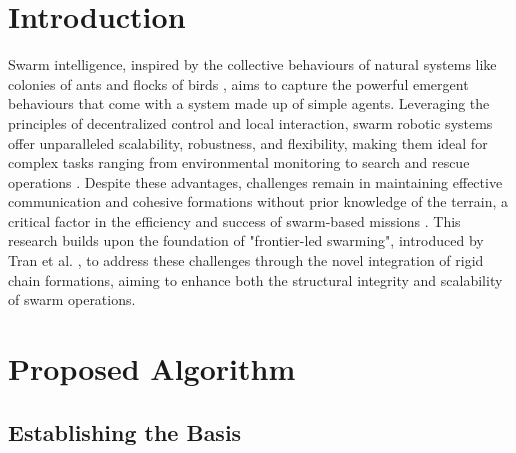 \documentclass[runningheads]{llncs}
\begin{document}
\section{Introduction}
Swarm intelligence, inspired by the collective behaviours of natural systems like colonies of ants and flocks of birds \cite{garnier2007}, aims to capture the powerful emergent behaviours that come with a system made up of simple agents\cite{mataric1995}.
Leveraging the principles of decentralized control and local interaction, swarm robotic systems offer unparalleled scalability, robustness, and flexibility, making them ideal for complex tasks ranging from environmental monitoring to search and rescue operations \cite{hamann2018,ijspeert2001}. 
Despite these advantages, challenges remain in maintaining effective communication and cohesive formations without prior knowledge of the terrain, a critical factor in the efficiency and success of swarm-based missions \cite{xu2014}. 
This research builds upon the foundation of "frontier-led swarming", introduced by Tran et al. \cite{tran2022}, to address these challenges through the novel integration of rigid chain formations, aiming to enhance both the structural integrity and scalability of swarm operations.









\section{Proposed Algorithm}
\subsection{Establishing the Basis}
\end{document}
